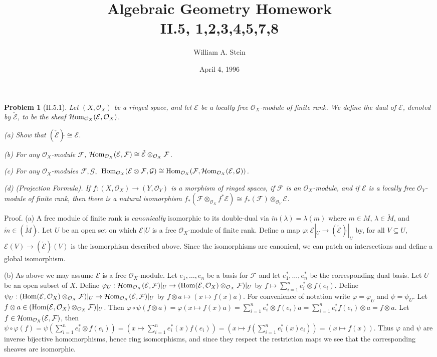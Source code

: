 \documentclass[12pt]{article}
\author{William A. Stein}
\title{Algebraic Geometry Homework\\
II.5, 1,2,3,4,5,7,8}
\date{April 4, 1996}
\newcommand{\sox}{\mathcal{O}_X}
\newcommand{\soy}{\mathcal{O}_Y}
\newcommand{\se}{\mathcal{E}}
\renewcommand{\sf}{\mathcal{F}}
\newcommand{\sg}{\mathcal{G}}
\newcommand{\shom}{\mathcal{H}\mbox{\rm om}}
\renewcommand{\hom}{\mbox{\rm Hom}}
\newcommand{\tensor}{\otimes}
\newcommand{\tens}{\otimes}
\newcommand{\into}{\rightarrow}
\newtheorem{prob}{Problem}
\renewcommand{\phi}{\varphi}
\newcommand{\proof}{\mbox{\sc Proof.\hspace{.1in}}}
\begin{document}
\maketitle

\begin{prob}[II.5.1]
Let $(X,\sox)$ be a ringed space, and let $\se$ be a locally
free $\sox$-module of finite rank. We define the dual of
$\se$, denoted by $\check{\se}$, to be the sheaf
$\shom_{\sox}(\se,\sox)$. 

(a) Show that $(\check{\se})\check{}\cong\se$.

(b) For any $\sox$-module $\sf$, $\shom_{\sox}(\se,\sf)
\cong \check{\se} \tensor_{\sox} \sf$. 

(c) For any $\sox$-modules $\sf, \sg,$
$\hom_{\sox}(\se\tensor\sf,\sg)\cong
\hom_{\sox}(\sf,\shom_{\sox}(\se,\sg))$. 

(d) (Projection Formula). If $f:(X,\sox)\rightarrow(Y,\soy)$
is a morphism of ringed spaces, if $\sf$ is an $\sox$-module,
and if $\se$ is a locally free $\soy$-module of finite
rank, then there is a natural isomorphism 
$f_{*}(\sf\tensor_{\sox}f^{*}\se)\cong
f_{*}(\sf)\tensor_{\soy}\se$. 


\end{prob}
\proof
(a) 
A free module of finite rank is {\em canonically}
isomorphic to its double-dual via
$\check{m}(\lambda)=\lambda(m)$
where $m\in M$, $\lambda\in \check{M}$, and
$\check{m}\in (\check{M})\check{}$. 
Let $U$ be an open set on which $\se|U$ is a
free $\sox$-module of finite rank. Define a
map $\phi:\se|_U\into(\check{\se})\check{}|_U$
by, for all $V\subseteq U$, $\se(V)\into
(\check{\se})\check{}(V)$ is the isomorphism described
above. 
Since the isomorphisms are canonical, we can patch on 
intersections and define a global isomorphism. 

(b) As above we may assume $\se$ is a free $\sox$-module.
Let $e_1,\ldots,e_n$ be a basis for $\sf$ and let
$e_1^{*},\ldots,e_n^{*}$ be the corresponding dual
basis. Let $U$ be an open subset of $X$. 
Define $\phi_U:\shom_{\sox}(\se,\sf)|_U\into
(\hom(\se,\sox) \tensor_{\sox}\sf)|_U$ by 
$f\mapsto\sum_{i=1}^{n}e_i^{*}\tens f(e_i).$
Define $\psi_U:
(\hom(\se,\sox) \tensor_{\sox}\sf)|_U \into 
\shom_{\sox}(\se,\sf)|_U$ by
$f\tens a\mapsto(x\mapsto f(x)a)$. 
For convenience of notation write $\phi=\phi_U$ and
$\psi=\psi_U$. 
Let $f\tens a\in (\hom(\se,\sox) \tensor_{\sox}\sf)|_U$.
Then $\phi\circ\psi(f\tens a)
=\phi(x\mapsto f(x)a)=\sum_{i=1}^{n} e_i^{*}\tens
f(e_i)a=\sum_{i=1}^{n}e_i^{*}f(e_i)\tens a
=f\tens a$. Let $f\in\shom_{\sox}(\se,\sf)$, then
$\psi\circ\phi(f)=\psi(\sum_{i=1}^{n}e_i^{*}\tens f(e_i))
=(x\mapsto\sum_{i=1}^{n}e_i^{*}(x)f(e_i))
=(x\mapsto f(\sum_{i=1}^{n}e_i^{*}(x)e_i))
=(x\mapsto f(x))$.
Thus $\phi$ and $\psi$ are inverse bijective 
homomorphisms, hence ring isomorphisms, and since they
respect the restriction maps we see that the 
corresponding sheaves are isomorphic.
\end{document}
